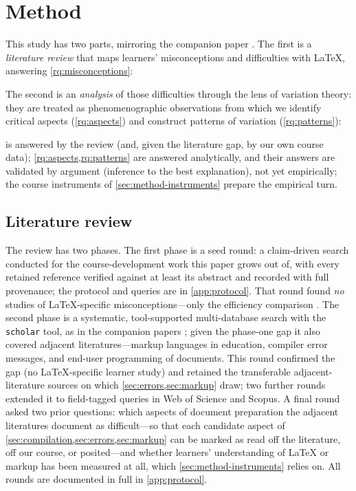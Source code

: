 \mode*
\section{Method}

This study has two parts, mirroring the companion paper
\autocite{VTProgMisconceptions}.
The first is a \emph{literature review} that maps learners' misconceptions
and difficulties with LaTeX, answering \cref{rq:misconceptions}:

\rqmisconceptions*

The second is an \emph{analysis} of those difficulties through the lens of
variation theory: they are treated as phenomenographic observations from
which we identify critical aspects (\cref{rq:aspects}) and construct
patterns of variation (\cref{rq:patterns}):

\rqaspects*
\rqpatterns*

 is answered by the review (and, given the
literature gap, by our own course data); \cref{rq:aspects,rq:patterns} are
answered analytically, and their answers are validated by argument
(inference to the best explanation), not yet empirically; the course
instruments of \cref{sec:method-instruments} prepare the empirical turn.

\subsection{Literature review}
\label{sec:method-litreview}

The review has two phases.
The first phase is a seed round: a claim-driven search conducted for the
course-development work this paper grows out of, with every retained
reference verified against at least its abstract and recorded with full
provenance; the protocol and queries are in \cref{app:protocol}.
That round found \emph{no} studies of LaTeX-specific misconceptions---only
the efficiency comparison \autocite{Knauff2014Latex}.
The second phase is a systematic, tool-supported multi-database search
with the \texttt{scholar} tool, as in the companion papers
\autocite{VTProgMisconceptions,VTDebug}; given the phase-one gap it also
covered adjacent literatures---markup languages in education, compiler
error messages, and end-user programming of documents.
This round confirmed the gap (no LaTeX-specific learner study) and
retained the transferable adjacent-literature sources on which
\cref{sec:errors,sec:markup} draw; two further rounds extended it to
field-tagged queries in Web of Science and Scopus.
A final round asked two prior questions: which aspects of document
preparation the adjacent literatures document as difficult---so that each
candidate aspect of \cref{sec:compilation,sec:errors,sec:markup} can be
marked as read off the literature, off our course, or posited---and
whether learners' understanding of LaTeX or markup has been measured at
all, which \cref{sec:method-instruments} relies on.
All rounds are documented in full in \cref{app:protocol}.

